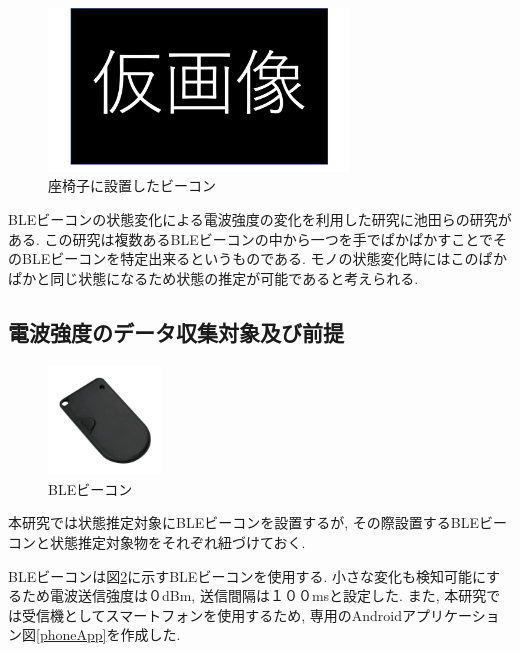 \documentclass[Japanese]{dicomopapers}
\begin{document}
\begin{figure}[ht]
    \centering
    \includegraphics[width=8cm]{tmp.png}
    \caption{座椅子に設置したビーコン}
    \label{chair}
\end{figure}

BLEビーコンの状態変化による電波強度の変化を利用した研究に池田ら\cite{BLEpkpk}の研究がある.
この研究は複数あるBLEビーコンの中から一つを手でぱかぱかすことでそのBLEビーコンを特定出来るというものである.
モノの状態変化時にはこのぱかぱかと同じ状態になるため状態の推定が可能であると考えられる.





\subsection{電波強度のデータ収集対象及び前提}
\begin{figure}[ht]
 \centering
 \includegraphics[width=3cm]{ble.png}
 \caption{BLEビーコン}
 \label{beacon}
\end{figure}
\fi

本研究では状態推定対象にBLEビーコンを設置するが, その際設置するBLEビーコンと状態推定対象物をそれぞれ紐づけておく.

BLEビーコンは図\ref{beacon}に示すBLEビーコンを使用する.
小さな変化も検知可能にするため電波送信強度は０dBm, 送信間隔は１００msと設定した.
また, 本研究では受信機としてスマートフォンを使用するため, 専用のAndroidアプリケーション図\ref{phoneApp}を作成した.
\end{document}

